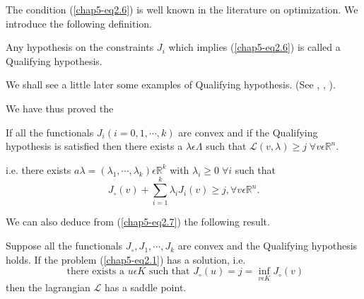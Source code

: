 The condition (\ref{chap5-eq2.6}) is well known in the literature on optimization. We introduce the following definition.

\begin{definition}\label{chap5-defi2.1}
Any hypothesis on the constraints $J_{i}$ which implies (\ref{chap5-eq2.6}) is called a Qualifying hypothesis.
\end{definition}

We shall see a little later some examples of Qualifying hypothesis. (See \cite{key26}, \cite{key27}, \cite{key28}).

We have thus proved the

\begin{theorem}\label{chap5-thm2.1}
If all the functionals $J_{i} (i = 0, 1, \cdots, k)$ are convex and if the Qualifying hypothesis is satisfied then there exists a $\lambda \epsilon \Lambda$ such that $\mathscr{L} (v, \lambda) \geq j \; \forall v \epsilon \mathbb{R}^{n}$.

i.e. there exists $a \lambda = (\lambda_{1}, \cdots, \lambda_{k}) \epsilon \mathbb{R}^{k}$ with $\lambda_{i} \geq 0 \; \forall i$ such that
$$
J_{\circ} (v) + \sum_{i=1}^{k} \lambda_{i} J_{i} (v) \geq j, \forall v \epsilon \mathbb{R}^{n}.
$$

We can also deduce from (\ref{chap5-eq2.7}) the following result.
\end{theorem}

\begin{theorem}\label{chap5-thm2.2}
Suppose all the functionals $J_{\circ}, J_{1}, \cdots, J_{k}$ are convex and the Qualifying hypothesis holds. If the problem (\ref{chap5-eq2.1}) has a solution, i.e. 
\begin{equation*}
\text{ there exists a } u \epsilon K \text{ such that } J_{\circ} (u) = j = \inf_{v \epsilon K} J_{\circ}(v) \tag{2.8}\label{chap5-eq2.8}
\end{equation*}
then the lagrangian $\mathscr{L}$ has a saddle point.
\end{theorem}

